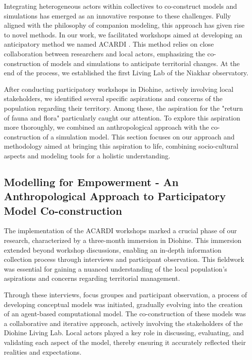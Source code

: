 \documentclass{article}
\begin{document}
Integrating heterogeneous actors within collectives to co-construct models and simulations has emerged as an innovative response to these challenges. Fully aligned with the philosophy of companion modeling, this approach has given rise to novel methods. In our work, we facilitated workshops aimed at developing an anticipatory method we named ACARDI \cite{perrotton_definition_2021}. This method relies on close collaboration between researchers and local actors, emphasizing the co-construction of models and simulations to anticipate territorial changes. At the end of the process, we established the first Living Lab of the Niakhar observatory.

After conducting participatory workshops in Diohine, actively involving local stakeholders, we identified several specific aspirations and concerns of the population regarding their territory. Among these, the aspiration for the "return of fauna and flora" particularly caught our attention. To explore this aspiration more thoroughly, we combined an anthropological approach with the co-construction of a simulation model. This section focuses on our approach and methodology aimed at bringing this aspiration to life, combining socio-cultural aspects and modeling tools for a holistic understanding.

\subsection{Modelling for Empowerment - An Anthropological Approach to Participatory Model Co-construction}

The implementation of the ACARDI workshops marked a crucial phase of our research, characterized by a three-month immersion in Diohine. This immersion extended beyond workshop discussions, enabling an in-depth information collection process through interviews and participant observation. This fieldwork was essential for gaining a nuanced understanding of the local population's aspirations and concerns regarding territorial management.

Through these interviews, focus groupes and participant observation, a process of developing conceptual models was initiated, gradually evolving into the creation of an agent-based computational model. The co-construction of these models was a collaborative and iterative approach, actively involving the stakeholders of the Diohine Living Lab. Local actors played a key role in discussing, evaluating, and validating each aspect of the model, thereby ensuring it accurately reflected their realities and expectations.
\end{document}
